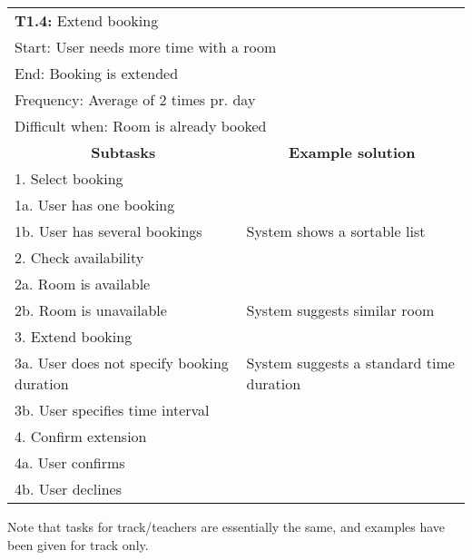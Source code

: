 \newline
\vspace{1cm}
\newline
\begin{tabular}{|p{6cm}|p{6cm}|}
\hline 
	\multicolumn{2}{|l|}{\textbf{T1.4:} \hspace{26mm}Extend booking} \\
	\multicolumn{2}{|l|}{Start: \hspace{26mm}User needs more time with a room} \\
	\multicolumn{2}{|l|}{End: \hspace{28mm}Booking is extended } \\
	\multicolumn{2}{|l|}{Frequency: \hspace{17mm}Average of 2 times pr. day} \\
	\multicolumn{2}{|l|}{Difficult when: \hspace{10mm}Room is already booked} \\ \hline
	\multicolumn{1}{|c|}{\textbf{Subtasks}} & \multicolumn{1}{c|}{\textbf{Example solution}} \\ \hline
	1.  Select booking & \\
	1a. User has one booking & \\
	1b. User has several bookings & System shows a sortable list \\ \hline
	2. Check availability & \\
	2a. Room is available & \\
	2b. Room is unavailable & System suggests similar room \\ \hline
	3.  Extend booking & \\
	3a. User does not specify booking duration & System suggests a standard time duration \\
	3b. User specifies time interval & \\ \hline
	4. Confirm extension & \\
	4a. User confirms & \\
	4b. User declines & \\ \hline
\end{tabular}
\newline
\vspace{1cm}
Note that tasks for track/teachers are essentially the same, and examples have been given for track only.
\newline
